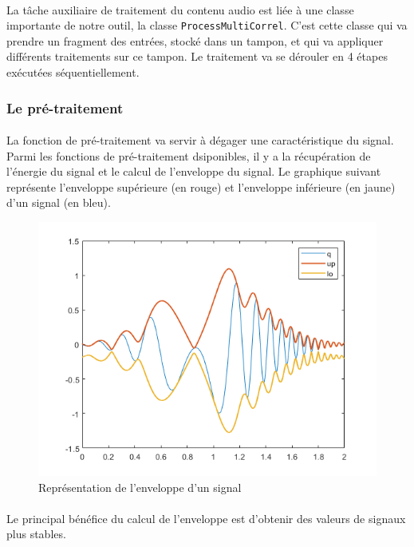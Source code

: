 \paragraph{}
La tâche auxiliaire de traitement du contenu audio est liée à une classe importante de notre outil, la classe \verb!ProcessMultiCorrel!. C'est cette classe qui va prendre un fragment des entrées, stocké dans un tampon, et qui va appliquer différents traitements sur ce tampon. Le traitement va se dérouler en 4 étapes exécutées séquentiellement.
\subsubsection{Le pré-traitement}
\paragraph{}
La fonction de pré-traitement va servir à dégager une caractéristique du signal. Parmi les fonctions de pré-traitement dsiponibles, il y a la récupération de l'énergie du signal et le calcul de l'enveloppe du signal. Le graphique suivant représente l'enveloppe supérieure (en rouge) et l'enveloppe inférieure (en jaune) d'un signal (en bleu). \cite{ENV}
\begin{figure}[H]
    \centering
    \includegraphics[scale=0.6]{assets/signal-enveloppe.png}
    \caption{Représentation de l'enveloppe d'un signal}
    \label{enveloppe signal}
\end{figure}
\paragraph{}
Le principal bénéfice du calcul de l'enveloppe est d'obtenir des valeurs de signaux plus stables.
